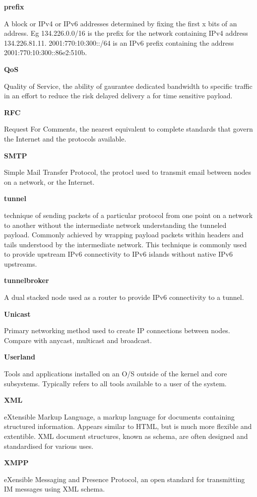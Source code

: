 \textbf{prefix}

A block or IPv4 or IPv6 addresses determined by fixing the first x bits
of an address. Eg 134.226.0.0/16 is the prefix for the network
containing IPv4 address 134.226.81.11. 2001:770:10:300::/64 is an IPv6
prefix containing the address 2001:770:10:300::86e2:510b. 

\textbf{QoS}

Quality of Service, the ability of gaurantee dedicated bandwidth to
specific traffic in an effort to reduce the risk delayed delivery a for
time sensitive payload.

\textbf{RFC}

Request For Comments, the nearest equivalent to complete standards that
govern the Internet and the protocols available.

\textbf{SMTP}

Simple Mail Transfer Protocol, the protocl used to transmit email
between nodes on a network, or the Internet.

\textbf{tunnel}

technique of sending packets of a particular protocol from one point on
a network to another without the intermediate network understanding the
tunneled payload. Commonly achieved by wrapping payload packets within
headers and tails understood by the intermediate network. This
technique is commonly used to provide upstream IPv6 connectivity to IPv6
islands without native IPv6 upstreams.

\textbf{tunnelbroker}

A dual stacked node used as a router to provide IPv6 connectivity to a
tunnel.

\textbf{Unicast}

Primary networking method used to create IP connections between nodes.
Compare with anycast, multicast and broadcast.

\textbf{Userland}

Tools and applications installed on an O/S outside of the kernel and
core subsystems. Typically refers to all tools available to a user of
the system.

\textbf{XML}

eXtensible Markup Language, a markup language for documents containing
structured information. Appears similar to HTML, but is much more
flexible and extentible. XML document structures, known as schema, are
often designed and standardised for various uses.

\textbf{XMPP}

eXensible Messaging and Presence Protocol, an open standard for
transmitting IM messages using XML schema.
